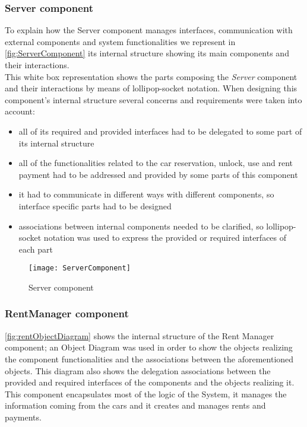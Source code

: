 \subsubsection{Server component}
To explain how the Server component manages interfaces, communication with external components and system functionalities we represent in \autoref{fig:ServerComponent} its internal structure showing its main components and their interactions.
\\

This white box representation shows the parts composing the \emph{Server} component and their interactions by means of lollipop-socket notation. When designing this component's internal structure several concerns and requirements were taken into account:
\begin{itemize}
	\item all of its required and provided interfaces had to be delegated to some part of its internal structure
	\item all of the functionalities related to the car reservation, unlock, use and rent payment had to be addressed and provided by some parts of this component
	\item it had to communicate in different ways with different components, so interface specific parts had to be designed
	\item associations between internal components needed to be clarified, so lollipop-socket notation was used to express the provided or required interfaces of each part
\end{itemize}

\begin{figure}[h]
			\centering
			\texttt{[image: ServerComponent]}
			\caption{
				\label{fig:ServerComponent} 
				Server component
			}
		\end{figure}
\clearpage

\subsubsection{RentManager component}

\autoref{fig:rentObjectDiagram} shows the internal structure of the Rent Manager component; an \mbox{Object} \mbox{Diagram} was used in order to show the objects realizing the component functionalities and the associations between the aforementioned objects. This diagram also shows the delegation associations between the provided and required interfaces of the components and the objects realizing it.
\\
This component encapsulates most of the logic of the System, it manages the information coming from the cars and it creates and manages rents and payments. 

